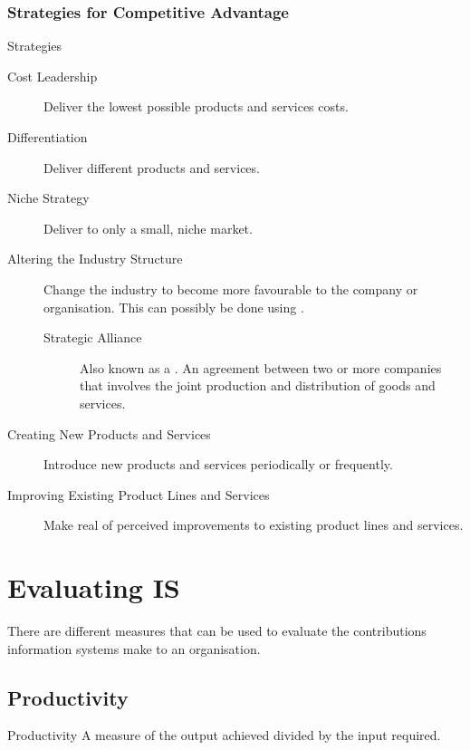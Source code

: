 \documentclass[\main/notes.tex]{subfiles}
\begin{document}
				\subsubsection{Strategies for Competitive Advantage}
					\begin{sidenote}{Strategies}
						\begin{description}
							\item[Cost Leadership] Deliver the lowest possible products and services costs.
							\item[Differentiation] Deliver different products and services.
							\item[Niche Strategy] Deliver to only a small, niche market.
							\item[Altering the Industry Structure] Change the industry to become more favourable to the company or organisation. This can possibly be done using .
								\begin{description}
									\item[Strategic Alliance] Also known as a . An agreement between two or more companies that involves the joint production and distribution of goods and services.
								\end{description}
							\item[Creating New Products and Services] Introduce new products and services periodically or frequently.
							\item[Improving Existing Product Lines and Services] Make real of perceived improvements to existing product lines and services.
						\end{description}
					\end{sidenote}

		\section{Evaluating IS}
			There are different measures that can be used to evaluate the contributions information systems make to an organisation.
			\subsection{Productivity}
				\begin{definition}{Productivity}
					A measure of the output achieved divided by the input required.
				\end{definition}
\end{document}
